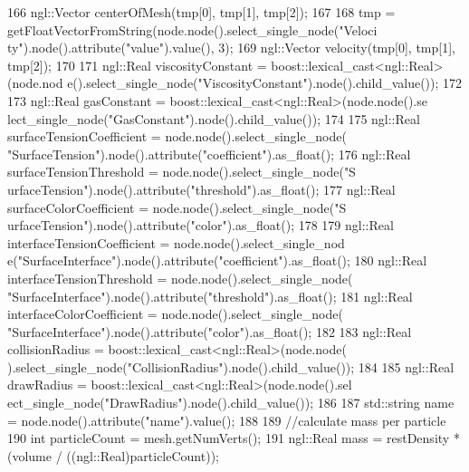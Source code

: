 \begin{DoxyCode}
{{{166             ngl::Vector centerOfMesh(tmp[0], tmp[1], tmp[2]);
167 
168             tmp = getFloatVectorFromString(node.node().select_single_node("Veloci
      ty").node().attribute("value").value(), 3);
169             ngl::Vector velocity(tmp[0], tmp[1], tmp[2]);
170 
171             ngl::Real viscosityConstant = boost::lexical_cast<ngl::Real>(node.nod
      e().select_single_node("ViscosityConstant").node().child_value());
172 
173             ngl::Real gasConstant = boost::lexical_cast<ngl::Real>(node.node().se
      lect_single_node("GasConstant").node().child_value());
174 
175             ngl::Real surfaceTensionCoefficient = node.node().select_single_node(
      "SurfaceTension").node().attribute("coefficient").as_float();
176             ngl::Real surfaceTensionThreshold = node.node().select_single_node("S
      urfaceTension").node().attribute("threshold").as_float();
177             ngl::Real surfaceColorCoefficient = node.node().select_single_node("S
      urfaceTension").node().attribute("color").as_float();
178 
179             ngl::Real interfaceTensionCoefficient = node.node().select_single_nod
      e("SurfaceInterface").node().attribute("coefficient").as_float();
180             ngl::Real interfaceTensionThreshold = node.node().select_single_node(
      "SurfaceInterface").node().attribute("threshold").as_float();
181             ngl::Real interfaceColorCoefficient = node.node().select_single_node(
      "SurfaceInterface").node().attribute("color").as_float();
182 
183             ngl::Real collisionRadius = boost::lexical_cast<ngl::Real>(node.node(
      ).select_single_node("CollisionRadius").node().child_value());
184 
185             ngl::Real drawRadius = boost::lexical_cast<ngl::Real>(node.node().sel
      ect_single_node("DrawRadius").node().child_value());
186 
187             std::string name = node.node().attribute("name").value();
188 
189             //calculate mass per particle
190             int particleCount = mesh.getNumVerts();
191             ngl::Real mass = restDensity * (volume / ((ngl::Real)particleCount));
      
}}}
\end{DoxyCode}
